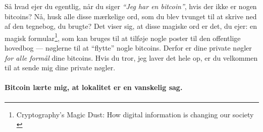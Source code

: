 Så hvad ejer du egentlig, når du siger \textit{\enquote{Jeg har en bitcoin}}, 
hvis der ikke er nogen bitcoins? Nå, husk alle disse mærkelige ord, som du blev 
tvunget til at skrive ned af den tegnebog, du brugte? Det viser sig, at disse 
magiske ord er det, du ejer: en magisk formular\footnote{Cryptography's Magic 
Dust: How digital information is changing our society \cite{gigi:magic-spell}}, 
som kan bruges til at tilføje nogle poster til den offentlige hovedbog --- 
nøglerne til at \enquote{flytte} nogle bitcoins. Derfor er dine private nøgler 
\textit{for alle formål} dine bitcoins. Hvis du tror, jeg laver det hele op, er 
du velkommen til at sende mig dine private nøgler.

\paragraph{Bitcoin lærte mig, at lokalitet er en vanskelig sag.}

%
%
%
%
%
%
%
